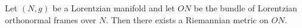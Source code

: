 Let $(N,g)$ be a Lorentzian manifold and let $ON$ be the bundle of Lorentzian orthonormal frames over $N$. Then there exists a Riemannian metric on $ON$.